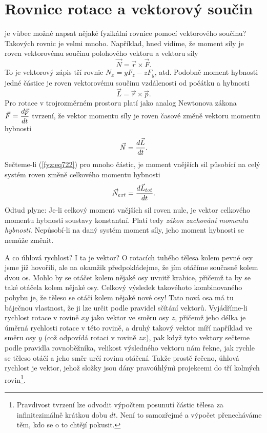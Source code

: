   \section{Rovnice rotace a vektorový součin}\label{fyz:IchapXXsecII}
    je vůbec možné napsat nějaké fyzikální rovnice pomocí vektorového součinu? Takových rovnic je
    velmi mnoho. Například, hned vidíme, že moment síly je roven vektorovému součinu polohového
    vektoru a vektoru síly
    \begin{equation}\label{fyz:eq720}
      \vec{N} = \vec{r}\times\vec{F}.
    \end{equation}
    To je vektorový zápis tří rovnic \(N_x = yF_z - zF_y\), atd. Podobně moment hybnosti jedné
    částice je roven vektorovému součinu vzdálenosti od počátku a hybnosti
    \begin{equation}\label{fyz:eq721}
      \vec{L} = \vec{r}\times\vec{p}.
    \end{equation}
    Pro rotace v trojrozměrném prostoru platí jako analog Newtonova zákona \(\vec{F} =
    \dfrac{d \vec{p}}{d t}\) tvrzení, že vektor momentu síly je roven časové změně vektoru momentu hybnosti
    \begin{equation}\label{fyz:eq722}
      \vec{N} = \dfrac{d \vec{L}}{d t}.
    \end{equation} 
    Sečteme-li (\ref{fyz:eq722}) pro mnoho částic, je moment vnějších sil působící na celý systém
    roven změně celkového momentu hybnosti
    \begin{equation}\label{fyz:eq723}
      \vec{N}_{ext} = \dfrac{d \vec{L}_{tot}}{d t}.
    \end{equation}   
    Odtud plyne: Je-li celkový moment vnějších sil roven nule, je vektor celkového momentu hybnosti
    soustavy konstantní. Platí tedy \emph{zákon zachování momentu hybnosti}. Nepůsobí-li na daný
    systém moment síly, jeho moment hybnosti se nemůže změnit.

    A co úhlová rychlost? I ta je vektor? O rotacích tuhého tělesa kolem pevné osy jsme již
    hovořili, ale na okamžik předpokládejme, že jím otáčíme současně kolem dvou os. Mohlo by se
    otáčet kolem nějaké osy uvnitř krabice, přičemž ta by se také otáčela kolem nějaké osy. Celkový
    výsledek takovéhoto kombinovaného pohybu je, že těleso se otáčí kolem nějaké nové osy! Tato nová
    osa má tu báječnou vlastnost, že ji lze určit podle pravidel sčítání vektorů. Vyjádříme-li
    rychlost rotace v rovině \(xy\) jako vektor ve směru osy \(z\), přičemž jeho délka je úměrná
    rychlosti rotace v této rovině, a druhý takový vektor míří například ve směru osy \(y\) (což
    odpovídá rotaci v rovině \(zx\)), pak když tyto vektory sečteme podle pravidla rovnoběžníka,
    velikost výsledného vektoru nám řekne, jak rychle se těleso otáčí a jeho směr určí rovinu
    otáčení. Takže prostě řečeno, úhlová rychlost je vektor, jehož složky jsou dány pravoúhlýmì
    projekcemi do tří kolmých rovin\footnote{Pravdivost tvrzení lze odvodit výpočtem posunutí částic
    tělesa za infinitezimálně krátkou dobu \(dt\). Není to samozřejmé a výpočet přenecháváme těm,
    kdo se o to chtějí pokusit.}.

